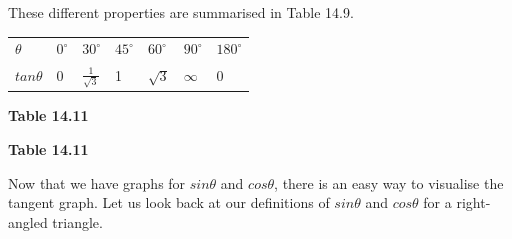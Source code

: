         \label{m39414*id88050}These different properties are summarised in Table 14.9.\par 
          \begin{table}[H]
        \begin{center}
      \label{m39414*id89593}
    \noindent
      \tablelasttail{}
      \begin{xtabular}[t]{|l|l|l|l|l|l|l|}\hline
                  $\theta $
                 &
                  ${0}^{\circ }$
                 &
                  ${30}^{\circ }$
                 &
                  ${45}^{\circ }$
                 &
                  ${60}^{\circ }$
                 &
                  ${90}^{\circ }$
                 &
                  ${180}^{\circ }$
     \tabularnewline{}
                  $tan\theta $
                 &
        0 &
                  $\frac{1}{\sqrt{3}}$
                 &
        1 &
                  $\sqrt{3}$
                 &
                  $\infty $
                 &
        0%
     \tabularnewline{}
    \end{xtabular}
      \end{center}
    \begin{center}{\small\bfseries Table 14.11}\end{center}
    \begin{caption}{\small\bfseries Table 14.11}\end{caption}
\end{table}
    \par
        \label{m39414*id89839}Now that we have graphs for $sin\theta $ and $cos\theta $, there is an easy way to visualise the tangent graph. Let us look back at our definitions of $sin\theta $ and $cos\theta $ for a right-angled triangle.\par 
        \label{m39414*id89902}\nopagebreak\noindent{}
          
